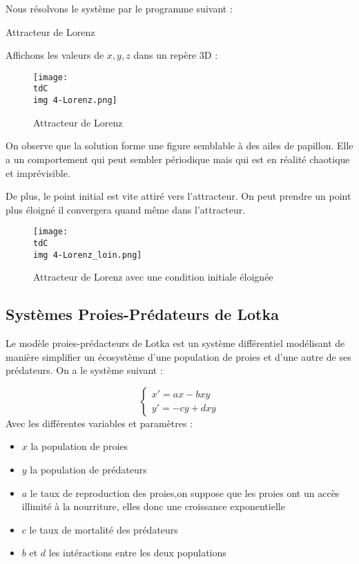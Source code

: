 		Nous résolvons le système par le programme suivant :

		\begin{listing}[H]
			\caption{Attracteur de Lorenz}
			\label{code-3-Lorenz}
		\end{listing}

		Affichons les valeurs de $x,y,z$ dans un repère 3D :

		\begin{figure}[H]
			\centering
			\texttt{[image: \\tdC\\img 4-Lorenz.png]}
			\caption{Attracteur de Lorenz}
			\label{img-3-Lorenz}
		\end{figure}

		On observe que la solution forme une figure semblable à des ailes de papillon. Elle a un comportement qui peut sembler périodique mais qui est en réalité chaotique et imprévisible.

		De plus, le point initial est vite attiré vers l'attracteur. On peut prendre un point plus éloigné il convergera quand même dans l'attracteur.

		\begin{figure}[H]
			\centering
			\texttt{[image: \\tdC\\img 4-Lorenz\_loin.png]}
			\caption{Attracteur de Lorenz avec une condition initiale éloignée}
			\label{img-3-LorenzLoin}
		\end{figure}



	\subsection{Systèmes Proies-Prédateurs de Lotka}

		Le modèle proies-prédacteurs de Lotka est un système différentiel modélisant de manière simplifier un écosystème d'une population de proies et d'une autre de ses prédateurs. On a le système suivant :

		\begin{equation}
			\begin{cases}
				x' = ax - bxy \\
				y' = -cy + dxy
			\end{cases}
		\end{equation}
		Avec les différentes variables et paramètres : 
		\begin{itemize}
			\item $x$ la population de proies
			\item $y$ la population de prédateurs
			\item $a$ le taux de reproduction des proies,on suppose que les proies ont un accès illimité à la nourriture, elles donc une croissance exponentielle
			\item $c$ le taux de mortalité des prédateurs
			\item $b$ et $d$ les intéractions entre les deux populations
		\end{itemize}

